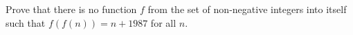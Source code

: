 Prove that there is no function $f$ from the set of non-negative integers into itself such that $f(f(n))=n+1987$ for all $n$.